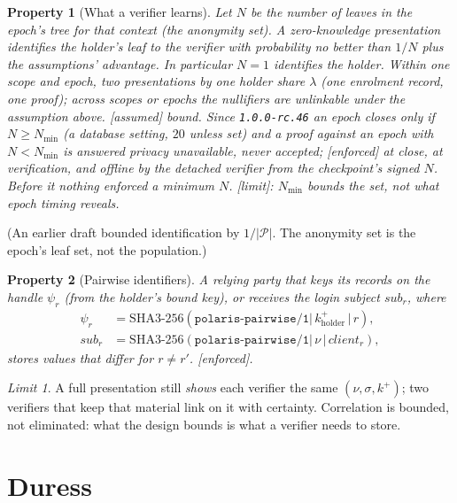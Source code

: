 \documentclass[11pt]{article}
\newtheorem{property}{Property}
\theoremstyle{remark}
\newtheorem*{limit}{Limit}
\newcommand{\Per}{\mathcal P}
\newcommand{\code}[1]{\texttt{#1}}
\newcommand{\emark}[1]{\textup{\textsf{[#1]}}}
\begin{document}
\begin{property}[What a verifier learns] Let $N$ be the number of leaves in the epoch's tree for that
context (the anonymity set). A zero-knowledge presentation identifies the holder's leaf to the
verifier with probability no better than $1/N$ plus the assumptions' advantage. In particular
$N=1$ identifies the holder. Within one scope and epoch, two presentations by one holder share
$\lambda$ (one enrolment record, one proof); across scopes or epochs the nullifiers are unlinkable under the
assumption above. \emark{assumed} bound. Since \code{1.0.0-rc.46} an epoch closes only if
$N\ge N_{\min}$ (a database setting, $20$ unless set) and a proof against an epoch with
$N<N_{\min}$ is answered \emph{privacy unavailable}, never accepted; \emark{enforced} at close,
at verification, and offline by the detached verifier from the checkpoint's signed $N$. Before it nothing enforced a minimum $N$. \emark{limit}: $N_{\min}$ bounds the
set, not what epoch timing reveals.
\end{property}
\noindent(An earlier draft bounded identification by $1/|\Per|$. The anonymity set is the epoch's leaf
set, not the population.)

\begin{property}[Pairwise identifiers] A relying party that keys its records on the handle $\psi_r$
(from the holder's bound key), or receives the login subject $\mathit{sub}_r$, where
\begin{align*}
\psi_r&=\mathrm{SHA3\text{-}256}(\texttt{polaris-pairwise/1|}\,k^+_{\mathrm{holder}}\,\texttt{|}\,r),\\
\mathit{sub}_r&=\mathrm{SHA3\text{-}256}(\texttt{polaris-pairwise/1|}\,\nu\,\texttt{|}\,\mathit{client}_r),
\end{align*}
stores values that differ for $r\neq r'$. \emark{enforced}.
\end{property}
\begin{limit}
A full presentation still \emph{shows} each verifier the same $(\nu,\sigma,k^+)$; two verifiers that
keep that material link on it with certainty. Correlation is bounded, not eliminated: what the design
bounds is what a verifier needs to store.
\end{limit}

\section{Duress}
\end{document}
